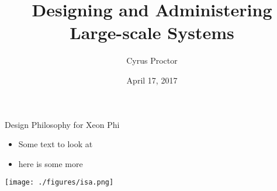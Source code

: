\documentclass[dvipsnames,aspectratio=169]{beamer}
\begin{document}
\title[FooBar]{Designing and Administering Large-scale Systems}
\author{Cyrus Proctor} 
\date{April 17, 2017} 


\frame{\titlepage} 

\begin{frame}{Design Philosophy for Xeon Phi}
  \begin{itemize}
    \item Some text to look at
    \item here is some more
  \end{itemize}
  \begin{center}
    \texttt{[image: ./figures/isa.png]}
  \end{center}
\end{frame}



\end{document}
